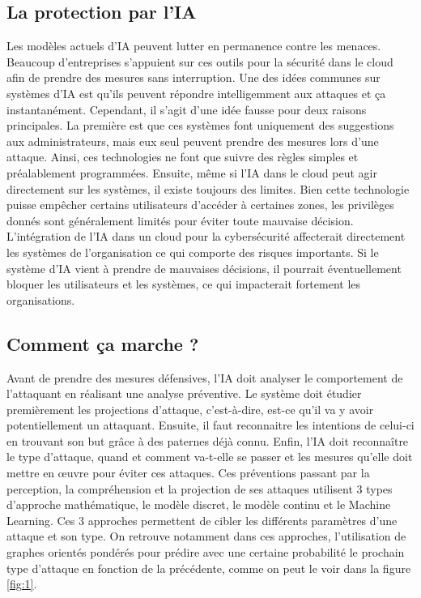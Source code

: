 \documentclass[a4paper, 12pt]{article}
\begin{document}
    \subsection{La protection par l'IA}
      Les modèles actuels d'IA peuvent lutter en permanence contre les
      menaces. Beaucoup d’entreprises s'appuient sur ces outils pour la sécurité
      dans le cloud afin de prendre des mesures sans interruption. Une des idées
      communes sur systèmes d'IA est qu'ils peuvent répondre intelligemment aux
      attaques et ça instantanément. Cependant, il s'agit d'une idée fausse pour
      deux raisons principales. La première est que ces systèmes font uniquement
      des suggestions aux administrateurs, mais eux seul peuvent prendre des
      mesures lors d'une attaque. Ainsi, ces technologies ne font que suivre des
      règles simples et préalablement programmées. Ensuite, même si l’IA dans le
      cloud peut agir directement sur les systèmes, il existe toujours des
      limites. Bien cette technologie puisse empêcher certains utilisateurs
      d'accéder à certaines zones, les privilèges donnés sont généralement
      limités pour éviter toute mauvaise décision. \\

      L’intégration de l’IA dans un cloud pour la cybersécurité affecterait
      directement les systèmes de l’organisation ce qui comporte des risques
      importants. Si le système d'IA vient à prendre de mauvaises décisions, il
      pourrait éventuellement bloquer les utilisateurs et les systèmes, ce qui
      impacterait fortement les organisations.

    \subsection{Comment ça marche ?}
      Avant de prendre des mesures défensives, l’IA doit analyser le
      comportement de l’attaquant en réalisant une analyse préventive. Le
      système doit étudier premièrement les projections d’attaque, c’est-à-dire,
      est-ce qu’il va y avoir potentiellement un attaquant. Ensuite, il faut
      reconnaitre les intentions de celui-ci en trouvant son but grâce à des
      paternes déjà connu. Enfin, l’IA doit reconnaître le type d’attaque, quand
      et comment va-t-elle se passer et les mesures qu’elle doit mettre en œuvre
      pour éviter ces attaques. Ces préventions passant par la perception, la
      compréhension et la projection de ses attaques utilisent 3 types
      d’approche mathématique, le modèle discret, le modèle continu et le
      Machine Learning. Ces 3 approches permettent de cibler les différents
      paramètres d’une attaque et son type. On retrouve notamment dans ces
      approches, l’utilisation de graphes orientés pondérés pour prédire avec
      une certaine probabilité le prochain type d’attaque en fonction de la
      précédente, comme on peut le voir dans la figure \ref{fig:1}. \\
\end{document}
